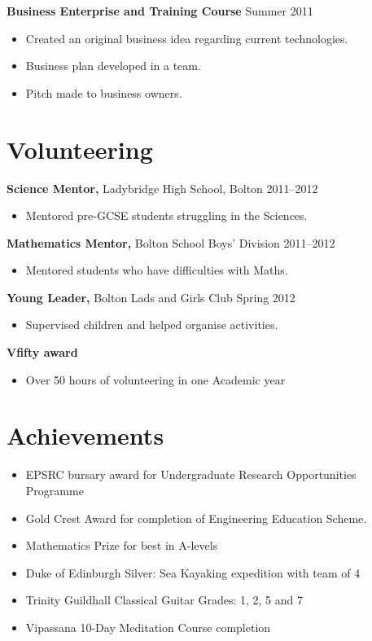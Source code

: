 \documentclass[margin]{res}
\begin{document}
\begin{resume}
{\bf Business Enterprise and Training Course} \hfill Summer 2011
\begin{itemize} \itemsep -2pt
\item Created an original business idea regarding current technologies.
\item Business plan developed in a team.
\item Pitch made to business owners.
\end{itemize}


\section{Volunteering} 
               {\bf Science Mentor,} Ladybridge High School, Bolton    \hfill       2011--2012
                \begin{itemize} \itemsep -2pt
              \item Mentored pre-GCSE students struggling in the Sciences.
         		\end{itemize}
		{\bf Mathematics Mentor,} Bolton School Boys' Division \hfill 2011--2012
                \begin{itemize} \itemsep -2pt
                 \item  Mentored students who have difficulties with Maths.
		 \end{itemize}
                  {\bf  Young Leader,} Bolton Lads and Girls Club    \hfill   Spring 2012
                 \begin{itemize} \itemsep -2pt
               \item    Supervised children and helped organise activities.
		\end{itemize}
	{\bf Vfifty award}
	\begin{itemize}
	\item Over 50 hours of volunteering in one Academic year 
		 \end{itemize}

\section{Achievements} 
\begin{itemize}\itemsep -2pt
\item EPSRC bursary award for Undergraduate Research Opportunities Programme
\item Gold Crest Award for completion of Engineering Education Scheme.
\item Mathematics Prize for best in A-levels
\item Duke of Edinburgh Silver: Sea Kayaking expedition with team of 4  
\item Trinity Guildhall Classical Guitar Grades: 1, 2, 5 and 7
\item Vipassana 10-Day Meditation Course completion


\end{itemize}
\end{resume}
\end{document}

